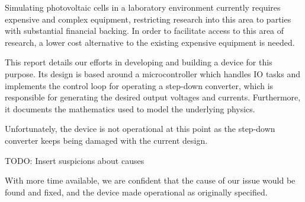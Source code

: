 

Simulating photovoltaic  cells in a laboratory  environment currently requires
expensive  and  complex equipment,  restricting  research  into this  area  to
parties with substantial financial backing.
In  order  to  facilitate access  to  this  area  of  research, a  lower  cost
alternative to the existing expensive equipment is needed.

This  report details  our  efforts in  developing and  building  a device  for
this  purpose. Its design  is  based around  a  microcontroller which  handles
IO  tasks  and   implements  the  control  loop  for   operating  a  step-down
converter, which  is responsible  for generating  the desired  output voltages
and  currents. Furthermore, it  documents the  mathematics used  to model  the
underlying physics.

Unfortunately, the  device is not operational  at this point as  the step-down
converter keeps being damaged with the current design.

TODO: Insert suspicions about causes

With more time available,  we are confident that the cause  of our issue would
be found and fixed, and the device made operational as originally specified.
